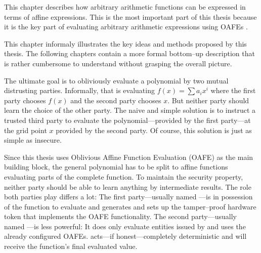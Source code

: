 \label{sec:methods}

This chapter describes how arbitrary arithmetic functions can be expressed in
terms of affine expressions. This is the most important part of this thesis
because it is the key part of evaluating arbitrary arithmetic expressions
using OAFEs \cite{davidgoliath}.


%
%
\label{sec:illustration}

This chapter informaly illustrates the key ideas and methods proposed by this
thesis. The following chapters contain a more formal bottom--up description that
is rather cumbersome to understand without grasping the overall picture.

The ultimate goal is to obliviously evaluate a polynomial by two mutual
distrusting parties. Informally, that is evaluating $f(x) = \sum a_ix^i$ where
the first party chooses $f(x)$ and the second party chooses $x$. But neither
party should learn the choice of the other party. The naive and simple solution
is to instruct a trusted third party to evaluate the polynomial---provided by
the first party---at the grid point $x$ provided by the second party.
Of course, this solution is just as simple as insecure.

Since this thesis uses Oblivious Affine Function Evaluation (OAFE) as the main
building block, the general polynomial has to be split to affine functions
evaluating parts of the complete function. To maintain the security property,
neither party should be able to learn anything by intermediate results. The role
both parties play differs a lot: The first party---usually named \JWpOne{}---is
in possession of the function to evaluate and generates and sets up the
tamper--proof hardware token that implements the OAFE functionality. The second
party---usually named \JWpTwo{}---is less powerful: It does only evaluate
entities issued by \JWpOne{} and uses the already configured OAFEs. \JWpTwo{}
acts---if honest---completely deterministic and will receive the function's
final evaluated value.

